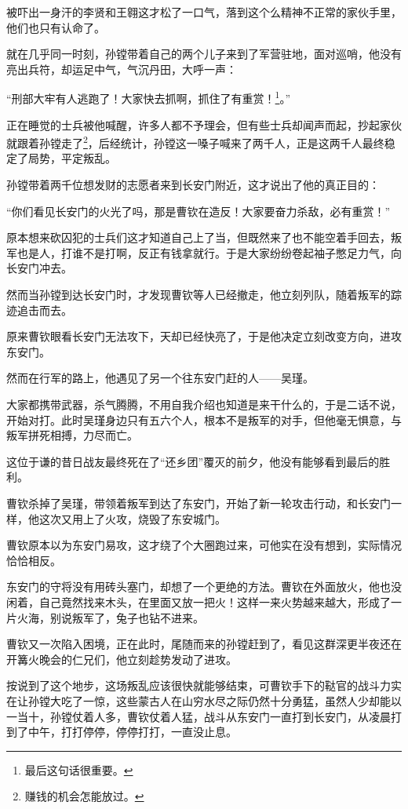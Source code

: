 \begin{multicols}{\theparacolNo}
		被吓出一身汗的李贤和王翱这才松了一口气，落到这个么精神不正常的家伙手里，他们也只有认命了。

		就在几乎同一时刻，孙镗带着自己的两个儿子来到了军营驻地，面对巡哨，他没有亮出兵符，却运足中气，气沉丹田，大呼一声：

		“刑部大牢有人逃跑了！大家快去抓啊，抓住了有重赏！\footnote{最后这句话很重要。}。”

		正在睡觉的士兵被他喊醒，许多人都不予理会，但有些士兵却闻声而起，抄起家伙就跟着孙镗走了\footnote{赚钱的机会怎能放过。}，后经统计，孙镗这一嗓子喊来了两千人，正是这两千人最终稳定了局势，平定叛乱。

		孙镗带着两千位想发财的志愿者来到长安门附近，这才说出了他的真正目的：

		“你们看见长安门的火光了吗，那是曹钦在造反！大家要奋力杀敌，必有重赏！”

		原本想来砍囚犯的士兵们这才知道自己上了当，但既然来了也不能空着手回去，叛军也是人，打谁不是打啊，反正有钱拿就行。于是大家纷纷卷起袖子憋足力气，向长安门冲去。

		然而当孙镗到达长安门时，才发现曹钦等人已经撤走，他立刻列队，随着叛军的踪迹追击而去。

		原来曹钦眼看长安门无法攻下，天却已经快亮了，于是他决定立刻改变方向，进攻东安门。

		然而在行军的路上，他遇见了另一个往东安门赶的人——吴瑾。

		大家都携带武器，杀气腾腾，不用自我介绍也知道是来干什么的，于是二话不说，开始对打。此时吴瑾身边只有五六个人，根本不是叛军的对手，但他毫无惧意，与叛军拼死相搏，力尽而亡。

		这位于谦的昔日战友最终死在了“还乡团”覆灭的前夕，他没有能够看到最后的胜利。

		曹钦杀掉了吴瑾，带领着叛军到达了东安门，开始了新一轮攻击行动，和长安门一样，他这次又用上了火攻，烧毁了东安城门。

		曹钦原本以为东安门易攻，这才绕了个大圈跑过来，可他实在没有想到，实际情况恰恰相反。

		东安门的守将没有用砖头塞门，却想了一个更绝的方法。曹钦在外面放火，他也没闲着，自己竟然找来木头，在里面又放一把火！这样一来火势越来越大，形成了一片火海，别说叛军了，兔子也钻不进来。

		曹钦又一次陷入困境，正在此时，尾随而来的孙镗赶到了，看见这群深更半夜还在开篝火晚会的仁兄们，他立刻趁势发动了进攻。

		按说到了这个地步，这场叛乱应该很快就能够结束，可曹钦手下的鞑官的战斗力实在让孙镗大吃了一惊，这些蒙古人在山穷水尽之际仍然十分勇猛，虽然人少却能以一当十，孙镗仗着人多，曹钦仗着人猛，战斗从东安门一直打到长安门，从凌晨打到了中午，打打停停，停停打打，一直没止息。


\end{multicols}
